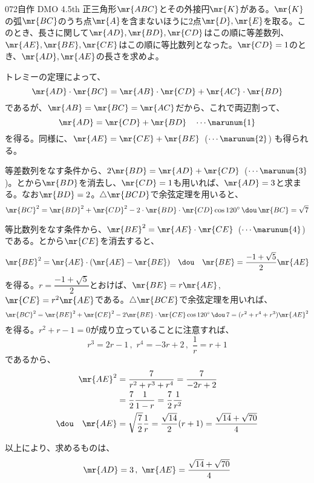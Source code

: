 \begin{thm}{072}{}{自作 DMO 4.5th}
 正三角形$\mr{ABC}$とその外接円$\mr{K}$がある。$\mr{K}$の弧$\mr{BC}$のうち点$\mr{A}$を含まないほうに2点$\mr{D}, \mr{E}$を取る。このとき、長さに関して$\mr{AD}, \mr{BD}, \mr{CD}$はこの順に等差数列、$\mr{AE}, \mr{BE}, \mr{CE}$はこの順に等比数列となった。$\mr{CD}=1$のとき、$\mr{AD}, \mr{AE}$の長さを求めよ。
\end{thm}

トレミーの定理によって、
\[ \mr{AD}\cdot\mr{BC}=\mr{AB}\cdot\mr{CD}+\mr{AC}\cdot\mr{BD} \]
であるが、$\mr{AB}=\mr{BC}=\mr{AC}$だから、これで両辺割って、
\[ \mr{AD}=\mr{CD}+\mr{BD} \quad\cdots \marunum{1} \]
を得る。同様に、$\mr{AE}=\mr{CE}+\mr{BE}$~($\cdots\marunum{2}$) も得られる。

等差数列をなす条件から、$2\mr{BD}=\mr{AD}+\mr{CD}$~($\cdots\marunum{3}$)。とから$\mr{BD}$を消去し、$\mr{CD}=1$も用いれば、$\mr{AD}=3$と求まる。なお$\mr{BD}=2$。$\triangle\mr{BCD}$で余弦定理を用いると、
\[ \mr{BC}^2=\mr{BD}^2+\mr{CD}^2-2\cdot\mr{BD}\cdot\mr{CD}\cos 120^\circ \,\dou\, \mr{BC}=\sqrt{7} \]

等比数列をなす条件から、$\mr{BE}^2=\mr{AE}\cdot\mr{CE}$~($\cdots\marunum{4}$) である。とから$\mr{CE}$を消去すると、
\[ \mr{BE}^2=\mr{AE}\cdot(\mr{AE}-\mr{BE}) \quad\dou\quad \mr{BE}=\frac{-1+\sqrt{5}}{2} \mr{AE} \]
を得る。$r=\dfrac{-1+\sqrt{5}}{2}$とおけば、$\mr{BE}=r\mr{AE}$, $\mr{CE}=r^2\mr{AE}$である。$\triangle\mr{BCE}$で余弦定理を用いれば、
\[ \mr{BC}^2=\mr{BE}^2+\mr{CE}^2-2\mr{BE}\cdot\mr{CE}\cos 120^\circ \,\dou\, 7=(r^2+r^4+r^3)\mr{AE}^2 \]
を得る。$r^2+r-1=0$が成り立っていることに注意すれば、
\[ r^3=2r-1 \,,\,\, r^4=-3r+2 \,,\,\, \frac{1}{r}=r+1 \]
であるから、
\begin{align*}
 \mr{AE}^2&=\frac{7}{r^2+r^3+r^4}=\frac{7}{-2r+2} \\
 &= \frac{7}{2}\frac{1}{1-r}=\frac{7}{2}\frac{1}{r^2} \\
 \dou\quad \mr{AE}&=\sqrt{\frac{7}{2}}\frac{1}{r} = \frac{\sqrt{14}}{2}(r+1) = \frac{\sqrt{14}+\sqrt{70}}{4}
\end{align*}

以上により、求めるものは、
\[ \mr{AD}=3 \,,\,\, \mr{AE}=\frac{\sqrt{14}+\sqrt{70}}{4} \] 